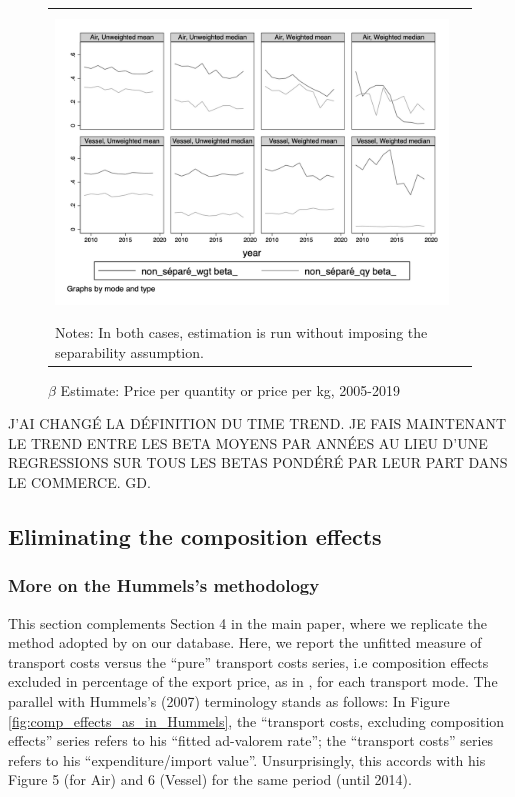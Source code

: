 \documentclass[11pt,twoside, authoryear]{elsarticle}
\begin{document}
\begin{figure}[htbp]
	\caption{$\beta$ Estimate: Price per quantity or price per kg, 2005-2019}
	\begin{center}
\begin{tabular}{cc}
	\includegraphics[height=8cm]{../scatter_chronology_non_separe_wgt_non_separe_qy.png}\\
\multicolumn{2}{l}{{\footnotesize Notes: In both cases, estimation is run without imposing the separability assumption.}}
\end{tabular}
	\end{center}
\end{figure}

J’AI CHANGÉ LA DÉFINITION DU TIME TREND. JE FAIS MAINTENANT LE TREND ENTRE LES BETA MOYENS PAR ANNÉES AU LIEU D’UNE REGRESSIONS SUR TOUS LES BETAS PONDÉRÉ PAR LEUR PART DANS LE COMMERCE. GD.


\setcounter{table}{0}
\renewcommand{\thetable}{E.\arabic{table}}

\setcounter{figure}{0}
\renewcommand{\thefigure}{E.\arabic{figure}}

\subsection{Eliminating the composition effects} \label{sec_oa:comp-effects}

\subsubsection{More on the Hummels's methodology}

This section complements Section 4 in the main paper, where we replicate the method adopted by \cite{hummels2007} on our database. Here, we report the unfitted measure of transport costs versus the ``pure'' transport costs series, i.e composition effects excluded
in percentage of the export price, as in \cite{hummels2007}, for each transport mode. The parallel with Hummels's (2007) terminology stands as follows: In Figure \ref{fig:comp_effects_as_in_Hummels}, the ``transport costs, excluding composition effects'' series refers to his ``fitted ad-valorem rate''; the ``transport costs'' series refers to his ``expenditure/import value''. Unsurprisingly, this accords with his Figure 5 (for Air) and 6 (Vessel) for the same period (until 2014).
\end{document}
